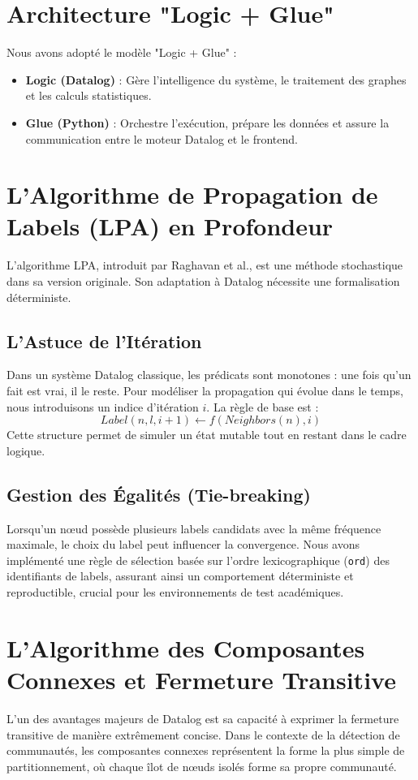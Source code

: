 \documentclass[12pt,a4paper]{report}
\begin{document}
\section{Architecture "Logic + Glue"}
Nous avons adopté le modèle "Logic + Glue" :
\begin{itemize}
    \item \textbf{Logic (Datalog)} : Gère l'intelligence du système, le traitement des graphes et les calculs statistiques.
    \item \textbf{Glue (Python)} : Orchestre l'exécution, prépare les données et assure la communication entre le moteur Datalog et le frontend.
\end{itemize}

\section{L'Algorithme de Propagation de Labels (LPA) en Profondeur}
L'algorithme LPA, introduit par Raghavan et al., est une méthode stochastique dans sa version originale. Son adaptation à Datalog nécessite une formalisation déterministe.

\subsection{L'Astuce de l'Itération}
Dans un système Datalog classique, les prédicats sont monotones : une fois qu'un fait est vrai, il le reste. Pour modéliser la propagation qui évolue dans le temps, nous introduisons un indice d'itération $i$. 
La règle de base est :
$$Label(n, l, i+1) \leftarrow f(Neighbors(n), i)$$
Cette structure permet de simuler un état mutable tout en restant dans le cadre logique.

\subsection{Gestion des Égalités (Tie-breaking)}
Lorsqu'un nœud possède plusieurs labels candidats avec la même fréquence maximale, le choix du label peut influencer la convergence. Nous avons implémenté une règle de sélection basée sur l'ordre lexicographique (\texttt{ord}) des identifiants de labels, assurant ainsi un comportement déterministe et reproductible, crucial pour les environnements de test académiques.

\section{L'Algorithme des Composantes Connexes et Fermeture Transitive}
L'un des avantages majeurs de Datalog est sa capacité à exprimer la fermeture transitive de manière extrêmement concise. Dans le contexte de la détection de communautés, les composantes connexes représentent la forme la plus simple de partitionnement, où chaque îlot de nœuds isolés forme sa propre communauté.
\end{document}
